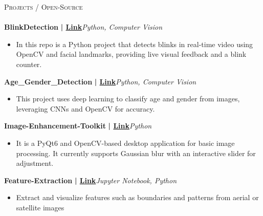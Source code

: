 \documentclass[a4paper]{article}
\newcommand{\lineunder} {
    \vspace*{-8pt} \\
    \hspace*{-18pt} \hrulefill \\
}
\newcommand{\header} [1] {
    {\hspace*{-18pt}\vspace*{6pt} \textsc{#1}}
    \vspace*{-6pt} \lineunder
}
\begin{document}
      \header{Projects / Open-Source}
      \vspace{2mm}
      {\textbf{BlinkDetection}}\textbf{ | \href{https://github.com/SudoAnirudh/BlinkDetection}{Link}}\hfill{\sl Python, Computer Vision}\\
          \vspace{-3mm}
\begin{itemize} \itemsep -3pt
\item[] In this repo is a Python project that detects blinks in real-time video using OpenCV and facial landmarks, providing live visual feedback and a blink counter.
\end{itemize}
          \vspace*{3mm}
      {\textbf{Age\_Gender\_Detection}}\textbf{ | \href{https://github.com/SudoAnirudh/Age\_Gender\_Detection}{Link}}\hfill{\sl Python, Computer Vision}\\
          \vspace{-3mm}
\begin{itemize} \itemsep -3pt
\item[] This project uses deep learning to classify age and gender from images, leveraging CNNs and OpenCV for accuracy.
\end{itemize}
          \vspace*{3mm}
      {\textbf{Image-Enhancement-Toolkit}}\textbf{ | \href{https://github.com/SudoAnirudh/Image-Enhancement-Toolkit}{Link}}\hfill{\sl Python}\\
          \vspace{-3mm}
\begin{itemize} \itemsep -3pt
\item[] It is a PyQt6 and OpenCV-based desktop application for basic image processing. It currently supports Gaussian blur with an interactive slider for adjustment.
\end{itemize}
          \vspace*{3mm}
      {\textbf{Feature-Extraction}}\textbf{ | \href{https://github.com/SudoAnirudh/Feature-Extraction}{Link}}\hfill{\sl Jupyter Notebook, Python}\\
          \vspace{-3mm}
\begin{itemize} \itemsep -3pt
\item[] Extract and visualize features such as boundaries and patterns from aerial or satellite images
\end{itemize}
\end{document}
